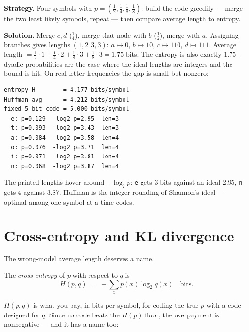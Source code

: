 \begin{example}\label{ex:huffman}
\textbf{Strategy.} Four symbols with
$p=(\tfrac12,\tfrac14,\tfrac18,\tfrac18)$: build the code greedily ---
merge the two least likely symbols, repeat --- then compare average
length to entropy.

\textbf{Solution.} Merge $c,d$ ($\tfrac14$), merge that node with $b$
($\tfrac12$), merge with $a$. Assigning branches gives lengths
$(1,2,3,3)$: $a\mapsto0$, $b\mapsto10$, $c\mapsto110$, $d\mapsto111$.
Average length $=\tfrac12\cdot1+\tfrac14\cdot2+\tfrac18\cdot3
+\tfrac18\cdot3 = 1.75$ bits. The entropy is also exactly
$1.75$ --- dyadic probabilities are the case where the ideal
lengths are integers and the bound is hit. On real letter frequencies
the gap is small but nonzero:

\begin{lstlisting}[caption={\ttfamily code/ch15\_huffman.py run ---
Huffman on 26 letters: $4.212$ bits/symbol vs.\ the $4.177$
entropy floor.},abovecaptionskip=0pt]
entropy H        = 4.177 bits/symbol
Huffman avg      = 4.212 bits/symbol
fixed 5-bit code = 5.000 bits/symbol
  e: p=0.129  -log2 p=2.95  len=3
  t: p=0.093  -log2 p=3.43  len=3
  a: p=0.084  -log2 p=3.58  len=4
  o: p=0.076  -log2 p=3.71  len=4
  i: p=0.071  -log2 p=3.81  len=4
  n: p=0.068  -log2 p=3.87  len=4
\end{lstlisting}

The printed lengths hover around $-\log_2 p$: \texttt{e} gets 3 bits
against an ideal 2.95, \texttt{n} gets 4 against 3.87. Huffman is the
integer-rounding of Shannon's ideal --- optimal among
one-symbol-at-a-time codes.
\end{example}

\section{Cross-entropy and KL divergence}\label{sec:info-kl}

The wrong-model average length deserves a name.

\begin{definition}\label{def:crossent}
The \emph{cross-entropy} of $p$ with respect to
$q$ is
\[
  H(p,q) \;=\; -\sum_x p(x)\log_2 q(x) \quad\text{bits}.
\]
\end{definition}

$H(p,q)$ is what you pay, in bits per symbol, for coding the true $p$
with a code designed for $q$. Since no code beats the $H(p)$ floor,
the overpayment is nonnegative --- and it has a name too:

